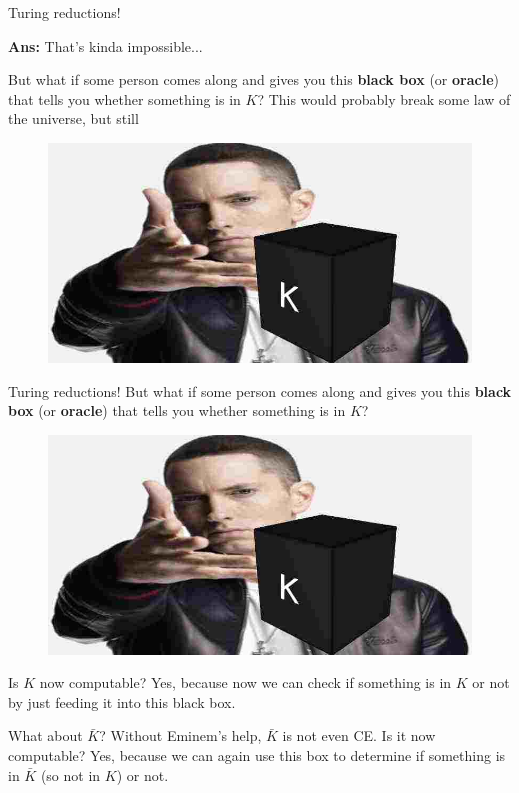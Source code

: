 \documentclass{beamer}
\begin{document}
\begin{frame}{Turing reductions!}

\pause

\textbf{Ans:} That's kinda impossible...

\pause

But what if some person comes along and gives you this \textbf{black box} (or \textbf{oracle}) that tells you whether something is in $K$? \tiny{This would probably break some law of the universe, but still}
\begin{figure}[h]
    \centering
    \includegraphics[scale=0.4]{img/eminem.jpg}
\end{figure}

\end{frame}

\begin{frame}{Turing reductions!}
But what if some person comes along and gives you this \textbf{black box} (or \textbf{oracle}) that tells you whether something is in $K$?
\begin{figure}[h]
    \centering
    \includegraphics[scale=0.2]{img/eminem.jpg}
\end{figure}

Is $K$ now computable? \pause Yes, because now we can check if something is in $K$ or not by just feeding it into this black box. \pause

What about $\bar{K}$? Without Eminem's help, $\bar{K}$ is not even CE. Is it now computable? \pause Yes, because we can again use this box to determine if something is in $\bar{K}$ (so not in $K$) or not.

\end{frame}
\end{document}
